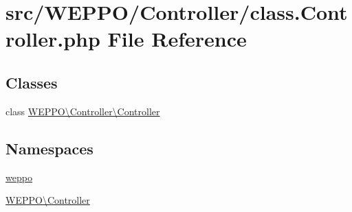 \hypertarget{class_8Controller_8php}{}\section{src/\+W\+E\+P\+P\+O/\+Controller/class.Controller.\+php File Reference}
\label{class_8Controller_8php}
\subsection*{Classes}
\begin{DoxyCompactItemize}
\item 
class \hyperlink{classWEPPO_1_1Controller_1_1Controller}{W\+E\+P\+P\+O\textbackslash{}\+Controller\textbackslash{}\+Controller}
\end{DoxyCompactItemize}
\subsection*{Namespaces}
\begin{DoxyCompactItemize}
\item 
 \hyperlink{namespaceweppo}{weppo}
\item 
 \hyperlink{namespaceWEPPO_1_1Controller}{W\+E\+P\+P\+O\textbackslash{}\+Controller}
\end{DoxyCompactItemize}
